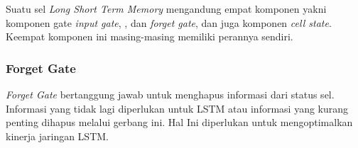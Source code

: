 \documentclass[./skripsi.tex]{subfiles}
\begin{document}
{\centering
{}}

\par Suatu sel \textit{Long Short Term Memory} mengandung empat komponen yakni komponen gate \textit{input gate}, , dan \textit{forget gate}, dan juga komponen \textit{cell state}. Keempat komponen ini masing-masing memiliki perannya sendiri.

\subsubsection{Forget Gate}
\par \textit{Forget Gate} bertanggung jawab untuk menghapus informasi dari status sel. Informasi yang tidak lagi diperlukan untuk LSTM atau informasi yang kurang penting dihapus melalui gerbang ini. Hal Ini diperlukan untuk mengoptimalkan kinerja jaringan LSTM.

\begin{center}
\end{center}
\end{document}
